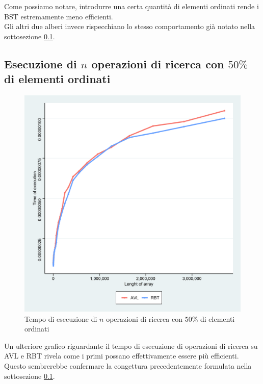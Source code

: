 \documentclass{article}
\begin{document}
	Come possiamo notare, introdurre una certa quantità di elementi ordinati rende i BST estremamente meno efficienti.\\
	Gli altri due alberi invece rispecchiano lo stesso comportamento già notato nella sottosezione \ref{subsection:n_op_ric}.
	
	\newpage
	
	\subsection{Esecuzione di $n$ operazioni di ricerca con $50\%$ di elementi ordinati}
	\label{subsection:n_op_ric}
	
	\begin{figure}[h!]
		\centering
  		\includegraphics[width=1 \columnwidth]{Grafici/Grafico_All_find_ordered_AvlRbt.png}
  		\caption{Tempo di esecuzione di $n$ operazioni di ricerca con $50\%$ di elementi ordinati}
  		\label{fig:graph5}
	\end{figure}
	
	Un ulteriore grafico riguardante il tempo di esecuzione di operazioni di ricerca su AVL e RBT rivela come i primi possano effettivamente essere più efficienti. Questo sembrerebbe confermare la congettura precedentemente formulata nella sottosezione \ref{subsection:n_op_ric}.
	\newpage
\end{document}
